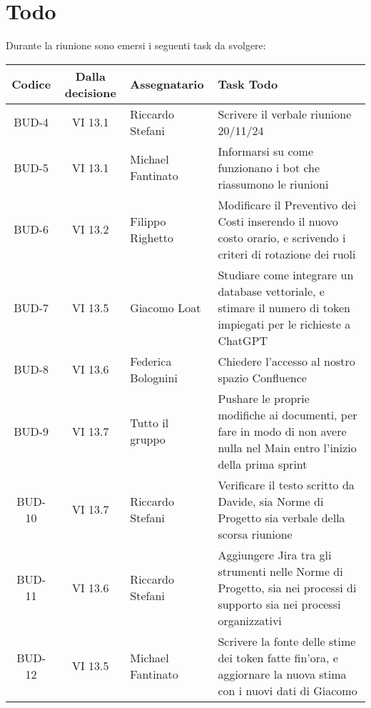
\section{Todo}

Durante la riunione sono emersi i seguenti task da svolgere:

\vspace{0.5cm}

\begin{table}[htbp]
\centering
{}
\begin{tabular}{|c|c|p{}|p{}|}
    \hline
    \rowcolor[gray]{0.75}
    \textbf{Codice} & \textbf{Dalla decisione} & \textbf{Assegnatario} & \textbf{Task Todo} \\
    \hline
    BUD-4 & VI 13.1 & Riccardo Stefani & Scrivere il verbale riunione 20/11/24 \\
    \hline
    BUD-5 & VI 13.1 & Michael Fantinato & Informarsi su come funzionano i bot che riassumono le riunioni \\
    \hline
    BUD-6 & VI 13.2 & Filippo Righetto & Modificare il Preventivo dei Costi inserendo il nuovo costo orario, e scrivendo i criteri di rotazione dei ruoli \\
    \hline
    BUD-7 & VI 13.5 & Giacomo Loat & Studiare come integrare un database vettoriale, e stimare il numero di token impiegati per le richieste a ChatGPT \\
    \hline
    BUD-8 & VI 13.6 & Federica Bolognini & Chiedere l'accesso al nostro spazio Confluence \\
    \hline
    BUD-9 & VI 13.7 & Tutto il gruppo & Pushare le proprie modifiche ai documenti, per fare in modo di non avere nulla nel Main entro l'inizio della prima sprint \\
    \hline
    BUD-10 & VI 13.7 & Riccardo Stefani & Verificare il testo scritto da Davide, sia Norme di Progetto sia verbale della scorsa riunione \\
    \hline
    BUD-11 & VI 13.6 & Riccardo Stefani & Aggiungere Jira tra gli strumenti nelle Norme di Progetto, sia nei processi di supporto sia nei processi organizzativi \\
    \hline
    BUD-12 & VI 13.5 & Michael Fantinato & Scrivere la fonte delle stime dei token fatte fin'ora, e aggiornare la nuova stima con i nuovi dati di Giacomo \\
    \hline
\end{tabular}
\end{table}